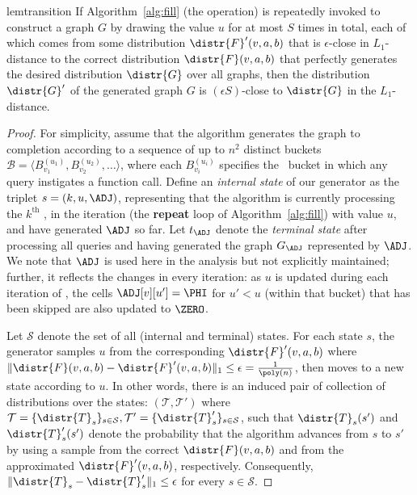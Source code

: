 \begin{restatable}{lem}{transition}\label{lemma:transition}
If Algorithm~\ref{alg:fill} (the  operation) is repeatedly invoked to construct a graph $G$ by drawing the value $u$ for at most $S$ times in total, each of which comes from some distribution $\distr{F}'(v,a,b)$ that is $\epsilon$-close in $L_1$-distance to the correct distribution $\distr{F}(v,a,b)$ that perfectly generates the desired distribution $\distr{G}$ over all graphs, then the distribution $\distr{G}'$ of the generated graph $G$ is $(\epsilon S)$-close to $\distr{G}$ in the $L_1$-distance.
\end{restatable}
\begin{proof}
\label{proof:transition}
For simplicity, assume that the algorithm generates the graph to completion according to a sequence of up to $n^2$ distinct buckets $\mathcal{B} = \langle B^{(u_1)}_{v_1}, B^{(u_2)}_{v_2}, \ldots \rangle$, where each $B^{(u_i)}_{v_i}$ specifies the \unfilled~bucket in which any query instigates a  function call. Define an \emph{internal state} of our generator as the triplet $s = (k, u, \ADJ)$, representing that the algorithm is currently processing the $k^\textrm{th}$ , in the iteration (the \textbf{repeat} loop of Algorithm~\ref{alg:fill}) with value $u$, and have generated $\ADJ$ so far. Let $t_{\ADJ}$ denote the \emph{terminal state} after processing all queries and having generated the graph $G_\ADJ$ represented by $\ADJ$. We note that $\ADJ$ is used here in the analysis but not explicitly maintained; further, it reflects the changes in every iteration: as $u$ is updated during each iteration of , the cells $\ADJ[v][u'] = \PHI$ for $u' < u$ (within that bucket) that has been skipped are also updated to $\ZERO$.

Let $\mathcal{S}$ denote the set of all (internal and terminal) states. For each state $s$, the generator samples $u$ from the corresponding $\distr{F}'(v,a,b)$ where $\|\distr{F}(v,a,b)-\distr{F}'(v,a,b)\|_1 \leq \epsilon = \frac{1}{\poly(n)}$, then moves to a new state according to $u$. In other words, there is an induced pair of collection of distributions over the states: $(\mathcal{T},\mathcal{T}')$ where $\mathcal{T}=\{\distr{T}_s\}_{s\in\mathcal{S}}, \mathcal{T}'=\{\distr{T}'_s\}_{s\in\mathcal{S}}$, such that $\distr{T}_s(s')$ and $\distr{T}'_s(s')$ denote the probability that the algorithm advances from $s$ to $s'$ by using a sample from the correct $\distr{F}(v,a,b)$ and from the approximated $\distr{F}'(v,a,b)$, respectively. Consequently, $\|\distr{T}_s-\distr{T}'_s\|_1 \leq \epsilon$ for every $s\in\mathcal{S}$.


\end{proof}
